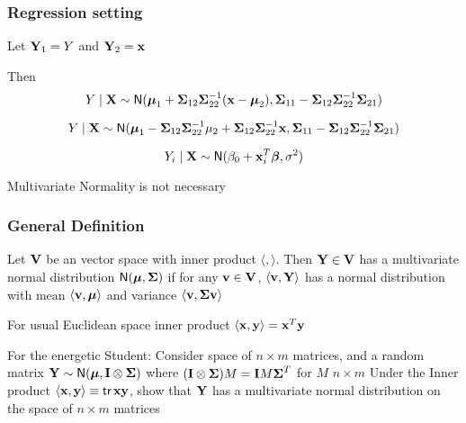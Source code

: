 \documentclass{beamer}
\begin{document}
\begin{frame}
  \frametitle{Regression setting}
  Let $\mathbf{Y}_1 = Y$ and  $\mathbf{Y}_2 = \mathbf{x}$

Then
$$
Y \mid \mathbf{X} \sim \textsf{N}( \boldsymbol{\mu}_1 + \boldsymbol{\Sigma}_{12} \boldsymbol{\Sigma}_{22}^{-1}( \mathbf{x} -
      \boldsymbol{\mu}_2),  \boldsymbol{\Sigma}_{11} - \boldsymbol{\Sigma}_{12} \boldsymbol{\Sigma}_{22}^{-1}
      \boldsymbol{\Sigma}_{21})
$$

$$
Y \mid \mathbf{X} \sim \textsf{N}( \boldsymbol{\mu}_1 - \boldsymbol{\Sigma}_{12} \boldsymbol{\Sigma}_{22}^{-1} \mu_2  + \boldsymbol{\Sigma}_{12} \boldsymbol{\Sigma}_{22}^{-1} \mathbf{x} ,  \boldsymbol{\Sigma}_{11} - \boldsymbol{\Sigma}_{12} \boldsymbol{\Sigma}_{22}^{-1}
      \boldsymbol{\Sigma}_{21})
$$

$$
Y_i \mid \mathbf{X} \sim \textsf{N}( \beta_0  + \mathbf{x}_i^T \boldsymbol{\beta} ,  \sigma^2)
$$

Multivariate Normality is not necessary
\end{frame}

\begin{frame}
  \frametitle{General Definition }
  \begin{definition}
  Let $\mathbf{V}$ be an vector  space with inner product $\langle ,
  \rangle$.  Then
  $\mathbf{Y} \in \mathbf{V}$ has a  multivariate normal distribution $\textsf{N}(\boldsymbol{\mu},
  \boldsymbol{\Sigma})$ if for any $\mathbf{v} \in \mathbf{V}$, $\langle \mathbf{v}, \mathbf{Y} \rangle$ has a normal
  distribution with mean $\langle \mathbf{v},\boldsymbol{\mu} \rangle $ and variance
  $\langle \mathbf{v},  \boldsymbol{\Sigma} \mathbf{v} \rangle$
  \end{definition} \pause

For usual Euclidean space inner product $\langle \mathbf{x}, \mathbf{y} \rangle =
\mathbf{x}^T\mathbf{y}$ \pause

\vfill
For the energetic Student:  Consider space of $n \times m$ matrices,
and a random matrix $\mathbf{Y} \sim \textsf{N}(\boldsymbol{\mu}, \mathbf{I} \otimes \boldsymbol{\Sigma})$
where  $(\mathbf{I} \otimes \boldsymbol{\Sigma}) M = \mathbf{I} M \boldsymbol{\Sigma}^T$ for $M$ $n \times m$
\pause
\vfill
Under the Inner product $\langle \mathbf{x}, \mathbf{y} \rangle \equiv \textsf{tr} \, \mathbf{x} \mathbf{y}$, show that $
\mathbf{Y}$ has a multivariate normal distribution on the space of $n \times
m$  matrices
\end{frame}
\end{document}
